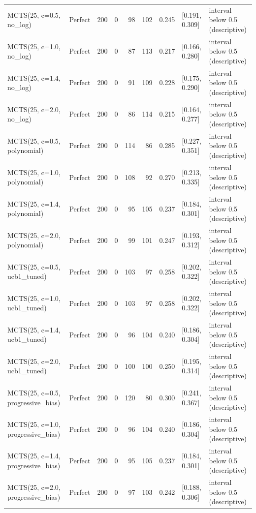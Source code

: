 \begin{table}[!t]
\begin{tabular}{llrrrrrll}
MCTS(25, c=0.5, no\_log) & Perfect & 200 & 0 & 98 & 102 & 0.245 & [0.191, 0.309] & interval below 0.5 (descriptive) \\
MCTS(25, c=1.0, no\_log) & Perfect & 200 & 0 & 87 & 113 & 0.217 & [0.166, 0.280] & interval below 0.5 (descriptive) \\
MCTS(25, c=1.4, no\_log) & Perfect & 200 & 0 & 91 & 109 & 0.228 & [0.175, 0.290] & interval below 0.5 (descriptive) \\
MCTS(25, c=2.0, no\_log) & Perfect & 200 & 0 & 86 & 114 & 0.215 & [0.164, 0.277] & interval below 0.5 (descriptive) \\
MCTS(25, c=0.5, polynomial) & Perfect & 200 & 0 & 114 & 86 & 0.285 & [0.227, 0.351] & interval below 0.5 (descriptive) \\
MCTS(25, c=1.0, polynomial) & Perfect & 200 & 0 & 108 & 92 & 0.270 & [0.213, 0.335] & interval below 0.5 (descriptive) \\
MCTS(25, c=1.4, polynomial) & Perfect & 200 & 0 & 95 & 105 & 0.237 & [0.184, 0.301] & interval below 0.5 (descriptive) \\
MCTS(25, c=2.0, polynomial) & Perfect & 200 & 0 & 99 & 101 & 0.247 & [0.193, 0.312] & interval below 0.5 (descriptive) \\
MCTS(25, c=0.5, ucb1\_tuned) & Perfect & 200 & 0 & 103 & 97 & 0.258 & [0.202, 0.322] & interval below 0.5 (descriptive) \\
MCTS(25, c=1.0, ucb1\_tuned) & Perfect & 200 & 0 & 103 & 97 & 0.258 & [0.202, 0.322] & interval below 0.5 (descriptive) \\
MCTS(25, c=1.4, ucb1\_tuned) & Perfect & 200 & 0 & 96 & 104 & 0.240 & [0.186, 0.304] & interval below 0.5 (descriptive) \\
MCTS(25, c=2.0, ucb1\_tuned) & Perfect & 200 & 0 & 100 & 100 & 0.250 & [0.195, 0.314] & interval below 0.5 (descriptive) \\
MCTS(25, c=0.5, progressive\_bias) & Perfect & 200 & 0 & 120 & 80 & 0.300 & [0.241, 0.367] & interval below 0.5 (descriptive) \\
MCTS(25, c=1.0, progressive\_bias) & Perfect & 200 & 0 & 96 & 104 & 0.240 & [0.186, 0.304] & interval below 0.5 (descriptive) \\
MCTS(25, c=1.4, progressive\_bias) & Perfect & 200 & 0 & 95 & 105 & 0.237 & [0.184, 0.301] & interval below 0.5 (descriptive) \\
MCTS(25, c=2.0, progressive\_bias) & Perfect & 200 & 0 & 97 & 103 & 0.242 & [0.188, 0.306] & interval below 0.5 (descriptive) \\

\end{tabular}
\end{table}
